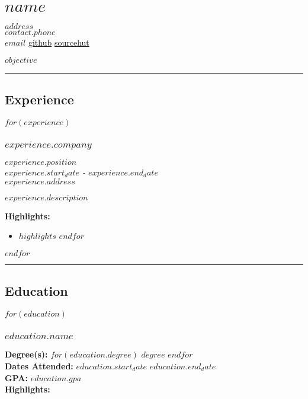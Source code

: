 
\section{$name$}

$address$\\
$contact.phone$\\
\href{mailto:$contact.email$}{$email$}
\textbar{} \href{$contact.github$}{github} \textbar{}
\href{$contact.sourcehut$}{sourcehut}

$objective$

\begin{center}\rule{0.5\linewidth}{0.5pt}\end{center}

\subsection{Experience}

$for(experience)$
\subsubsection{$experience.company$}

\textbf{$experience.position$}\\
\emph{$experience.start_date$ - $experience.end_date$}\\
\emph{$experience.address$}

$experience.description$

\textbf{Highlights:}

\begin{itemize}
\tightlist
$for(experience.highlights)$
\item
  $highlights$
$endfor$
\end{itemize}
$endfor$

\begin{center}\rule{0.5\linewidth}{0.5pt}\end{center}

\subsection{Education}

$for(education)$
\subsubsection{$education.name$}

\textbf{Degree(s):} $for(education.degree)$ $degree$ $endfor$\\
\textbf{Dates Attended:} $education.start_date$ $education.end_date$\\
\textbf{GPA:} $education.gpa$\\
\textbf{Highlights:}

